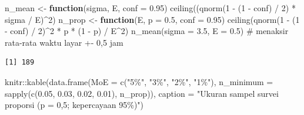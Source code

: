 \documentclass[
  indonesian,
  letterpaper,
]{book}
\newenvironment{Shaded}{\begin{snugshade}}{\end{snugshade}}
\newcommand{\AttributeTok}[1]{\textcolor[rgb]{0.40,0.45,0.13}{#1}}
\newcommand{\CommentTok}[1]{\textcolor[rgb]{0.37,0.37,0.37}{#1}}
\newcommand{\ControlFlowTok}[1]{\textcolor[rgb]{0.00,0.23,0.31}{\textbf{#1}}}
\newcommand{\DecValTok}[1]{\textcolor[rgb]{0.68,0.00,0.00}{#1}}
\newcommand{\FloatTok}[1]{\textcolor[rgb]{0.68,0.00,0.00}{#1}}
\newcommand{\FunctionTok}[1]{\textcolor[rgb]{0.28,0.35,0.67}{#1}}
\newcommand{\NormalTok}[1]{\textcolor[rgb]{0.00,0.23,0.31}{#1}}
\newcommand{\OtherTok}[1]{\textcolor[rgb]{0.00,0.23,0.31}{#1}}
\newcommand{\SpecialCharTok}[1]{\textcolor[rgb]{0.37,0.37,0.37}{#1}}
\newcommand{\StringTok}[1]{\textcolor[rgb]{0.13,0.47,0.30}{#1}}
\begin{document}
\begin{Shaded}
\begin{Highlighting}[]
\NormalTok{n\_mean }\OtherTok{\textless{}{-}} \ControlFlowTok{function}\NormalTok{(sigma, E, }\AttributeTok{conf =} \FloatTok{0.95}\NormalTok{) }\FunctionTok{ceiling}\NormalTok{((}\FunctionTok{qnorm}\NormalTok{(}\DecValTok{1} \SpecialCharTok{{-}}\NormalTok{ (}\DecValTok{1} \SpecialCharTok{{-}}\NormalTok{ conf) }\SpecialCharTok{/} \DecValTok{2}\NormalTok{) }\SpecialCharTok{*}\NormalTok{ sigma }\SpecialCharTok{/}\NormalTok{ E)}\SpecialCharTok{\^{}}\DecValTok{2}\NormalTok{)}
\NormalTok{n\_prop }\OtherTok{\textless{}{-}} \ControlFlowTok{function}\NormalTok{(E, }\AttributeTok{p =} \FloatTok{0.5}\NormalTok{, }\AttributeTok{conf =} \FloatTok{0.95}\NormalTok{) }\FunctionTok{ceiling}\NormalTok{(}\FunctionTok{qnorm}\NormalTok{(}\DecValTok{1} \SpecialCharTok{{-}}\NormalTok{ (}\DecValTok{1} \SpecialCharTok{{-}}\NormalTok{ conf) }\SpecialCharTok{/} \DecValTok{2}\NormalTok{)}\SpecialCharTok{\^{}}\DecValTok{2} \SpecialCharTok{*}\NormalTok{ p }\SpecialCharTok{*}\NormalTok{ (}\DecValTok{1} \SpecialCharTok{{-}}\NormalTok{ p) }\SpecialCharTok{/}\NormalTok{ E}\SpecialCharTok{\^{}}\DecValTok{2}\NormalTok{)}
\FunctionTok{n\_mean}\NormalTok{(}\AttributeTok{sigma =} \FloatTok{3.5}\NormalTok{, }\AttributeTok{E =} \FloatTok{0.5}\NormalTok{) }\CommentTok{\# menaksir rata{-}rata waktu layar +{-} 0,5 jam}
\end{Highlighting}
\end{Shaded}

\begin{verbatim}
[1] 189
\end{verbatim}

\begin{Shaded}
\begin{Highlighting}[]
\NormalTok{knitr}\SpecialCharTok{::}\FunctionTok{kable}\NormalTok{(}\FunctionTok{data.frame}\NormalTok{(}\AttributeTok{MoE =} \FunctionTok{c}\NormalTok{(}\StringTok{"5\%"}\NormalTok{, }\StringTok{"3\%"}\NormalTok{, }\StringTok{"2\%"}\NormalTok{, }\StringTok{"1\%"}\NormalTok{),}
\AttributeTok{n\_minimum =} \FunctionTok{sapply}\NormalTok{(}\FunctionTok{c}\NormalTok{(}\FloatTok{0.05}\NormalTok{, }\FloatTok{0.03}\NormalTok{, }\FloatTok{0.02}\NormalTok{, }\FloatTok{0.01}\NormalTok{), n\_prop)),}
\AttributeTok{caption =} \StringTok{"Ukuran sampel survei proporsi (p = 0,5; kepercayaan 95\%)"}\NormalTok{)}
\end{Highlighting}
\end{Shaded}
\end{document}
